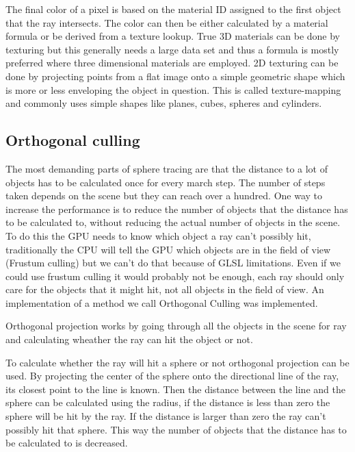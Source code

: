 			The final color of a pixel is based on the material ID assigned to
			the first object that the ray intersects. The color can then be
			either calculated by a material formula or be derived from a
			texture lookup. True 3D materials can be done by texturing but this
			generally needs a large data set and thus a formula is mostly
			preferred where three dimensional materials are employed. 2D
			texturing can be done by projecting points from a flat image onto a
			simple geometric shape  which is more or less enveloping the object
			in question. This is called texture-mapping and commonly uses
			simple shapes like planes, cubes, spheres and cylinders. 


		\subsection{Orthogonal culling}

			The most demanding parts of sphere tracing are that the distance to
			a lot of objects has to be calculated once for every march step.
			The number of steps taken depends on the scene but they can reach
			over a hundred. One way to increase the performance is to reduce
			the number of objects that the distance has to be calculated to,
			without reducing the actual number of objects in the scene. To do
			this the GPU needs to know which object a ray can't possibly hit,
			traditionally the CPU will tell the GPU which objects are in the
			field of view (Frustum culling) but we can't do that because of
			GLSL limitations. Even if we could use frustum culling it would
			probably not be enough, each ray should only care for the objects
			that it might hit, not all objects in the field of view.  An
			implementation of a method we call Orthogonal Culling was
			implemented.

			Orthogonal projection works by going through all the objects in the 
			scene for ray and calculating wheather the ray can hit the object
			or not. 

			To calculate whether the ray will hit a sphere or not orthogonal
			projection can be used. By projecting the center of the sphere onto
			the directional line of the ray, its closest point to the line is
			known.  Then the distance between the line and the sphere can be
			calculated using the radius, if the distance is less than zero the
			sphere will be hit by the ray. If the distance is larger than zero
			the ray can't possibly hit that sphere. This way the number of
			objects that the distance has to be calculated to is decreased.

